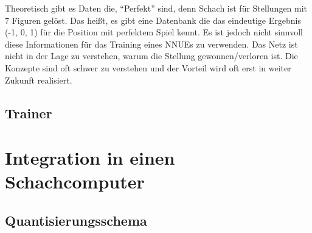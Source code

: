 Theoretisch gibt es Daten die, \enquote{Perfekt} sind, denn Schach ist für Stellungen mit 7 Figuren gelöst. Das heißt, es gibt eine Datenbank die das eindeutige Ergebnis (-1, 0, 1) für die Position mit perfektem Spiel kennt. Es ist jedoch nicht sinnvoll diese Informationen für das Training eines \acp{NNUE} zu verwenden. Das Netz ist nicht in der Lage zu verstehen, warum die Stellung gewonnen/verloren ist. Die Konzepte sind oft schwer zu verstehen und der Vorteil wird oft erst in weiter Zukunft realisiert.

\subsection{Trainer}


\cite{Zeiler2012}



\section{Integration in einen Schachcomputer}

\subsection{Quantisierungsschema}

